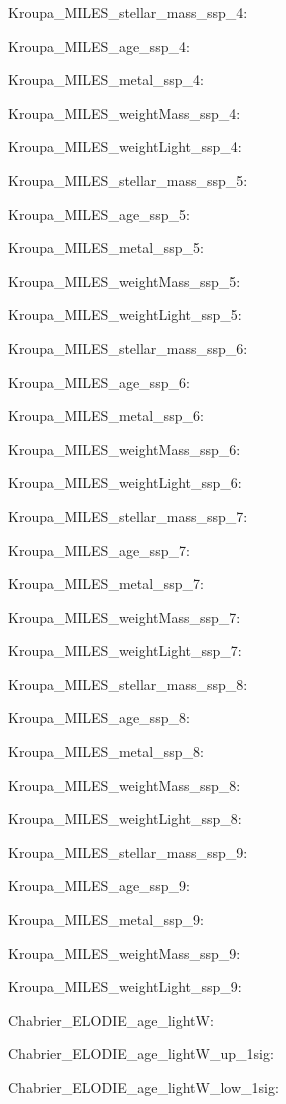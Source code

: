 \item Kroupa\_MILES\_stellar\_mass\_ssp\_4: 
\item Kroupa\_MILES\_age\_ssp\_4: 
\item Kroupa\_MILES\_metal\_ssp\_4: 
\item Kroupa\_MILES\_weightMass\_ssp\_4: 
\item Kroupa\_MILES\_weightLight\_ssp\_4: 
\item Kroupa\_MILES\_stellar\_mass\_ssp\_5: 
\item Kroupa\_MILES\_age\_ssp\_5: 
\item Kroupa\_MILES\_metal\_ssp\_5: 
\item Kroupa\_MILES\_weightMass\_ssp\_5: 
\item Kroupa\_MILES\_weightLight\_ssp\_5: 
\item Kroupa\_MILES\_stellar\_mass\_ssp\_6: 
\item Kroupa\_MILES\_age\_ssp\_6: 
\item Kroupa\_MILES\_metal\_ssp\_6: 
\item Kroupa\_MILES\_weightMass\_ssp\_6: 
\item Kroupa\_MILES\_weightLight\_ssp\_6: 
\item Kroupa\_MILES\_stellar\_mass\_ssp\_7: 
\item Kroupa\_MILES\_age\_ssp\_7: 
\item Kroupa\_MILES\_metal\_ssp\_7: 
\item Kroupa\_MILES\_weightMass\_ssp\_7: 
\item Kroupa\_MILES\_weightLight\_ssp\_7: 
\item Kroupa\_MILES\_stellar\_mass\_ssp\_8: 
\item Kroupa\_MILES\_age\_ssp\_8: 
\item Kroupa\_MILES\_metal\_ssp\_8: 
\item Kroupa\_MILES\_weightMass\_ssp\_8: 
\item Kroupa\_MILES\_weightLight\_ssp\_8: 
\item Kroupa\_MILES\_stellar\_mass\_ssp\_9: 
\item Kroupa\_MILES\_age\_ssp\_9: 
\item Kroupa\_MILES\_metal\_ssp\_9: 
\item Kroupa\_MILES\_weightMass\_ssp\_9: 
\item Kroupa\_MILES\_weightLight\_ssp\_9: 
\item Chabrier\_ELODIE\_age\_lightW: 
\item Chabrier\_ELODIE\_age\_lightW\_up\_1sig: 
\item Chabrier\_ELODIE\_age\_lightW\_low\_1sig: 
